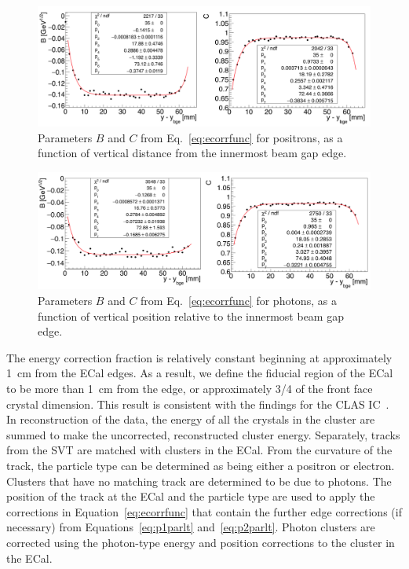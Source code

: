 \begin{figure}[htb]
  \centering
      \includegraphics[width=1.0\textwidth]{pics/performance/sfparEdge_ep.png}
  \caption[ECal energy shower parameters for positrons relative to the inside beam gap edge]{Parameters $B$ and $C$ from Eq.~\ref{eq:ecorrfunc} for positrons, as a function of vertical distance from the innermost beam gap edge.}
  \label{Figure:sfparEdgeEP}
\end{figure}

\begin{figure}[htb]
  \centering
      \includegraphics[width=1.0\textwidth]{pics/performance/sfparEdge_p.png}
  \caption[ECal energy shower parameters for photons relative to the inside beam gap edge]{Parameters $B$ and $C$ from Eq.~\ref{eq:ecorrfunc} for photons, as a function of vertical position
relative to the innermost beam gap edge.}
  \label{Figure:sfparEdgeP}
\end{figure}

The energy correction fraction is relatively constant beginning at approximately 1~cm from the ECal edges. As a result, we define the fiducial region of the ECal to be more than 1~cm from the edge, or approximately 3/4 of the front face crystal dimension. This result is consistent with the findings for the CLAS IC~\cite{szumila-vance_hps_ecal_2014}.\\
\indent In reconstruction of the data, the energy of all the crystals in the cluster are summed to make the uncorrected, reconstructed cluster energy. Separately, tracks from the SVT are matched with clusters in the ECal. From the curvature of the track, the particle type can be determined as being either a positron or electron. Clusters that have no matching track are determined to be due to photons. The position of the track at the ECal and the particle type are used to apply the corrections in Equation~\eqref{eq:ecorrfunc} that contain the further edge corrections (if necessary) from Equations~\eqref{eq:p1parlt} and~\eqref{eq:p2parlt}. Photon clusters are corrected using the photon-type energy and position corrections to the cluster in the ECal.  

